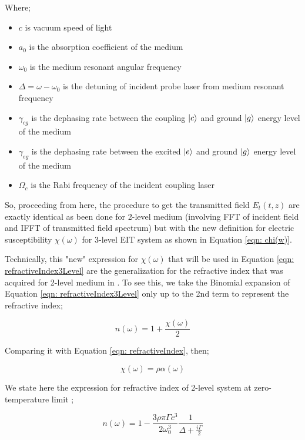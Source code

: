 Where;

\begin{itemize}
    \item $c$ is vacuum speed of light
    \item $a_{0}$ is the absorption coefficient of the medium
    \item $\omega_{0}$ is the medium resonant angular frequency
    \item $\Delta = \omega - \omega_{0}$ is the detuning of incident probe laser from medium resonant frequency
    \item $\gamma_{cg}$ is the dephasing rate between the coupling $\ket{c}$ and ground $\ket{g}$ energy level of the medium
    \item $\gamma_{eg}$ is the dephasing rate between the excited $\ket{e}$ and ground $\ket{g}$ energy level of the medium
    \item $\Omega_{c}$ is the Rabi frequency of the incident coupling laser
\end{itemize}   

So, proceeding from here, the procedure to get the transmitted field $E_{t}(t, z)$ are exactly identical as been done for 2-level medium (involving FFT of incident field and IFFT of transmitted field spectrum) but with the new definition for electric susceptibility $\chi(\omega)$ for 3-level EIT system as shown in Equation \ref{eqn: chi(w)}.

Technically, this "new" expression for $\chi(\omega)$ that will be used in Equation \ref{eqn: refractiveIndex3Level} are the generalization for the refractive index that was acquired for 2-level medium in \cite{Kwong2017}. To see this, we take the Binomial expansion of Equation \ref{eqn: refractiveIndex3Level} only up to the 2nd term to represent the refractive index;

\begin{equation}
    n(\omega) = 1 + \frac{\chi(\omega)}{2}
\end{equation}

Comparing it with Equation \ref{eqn: refractiveIndex}, then;

\begin{equation}
    \chi(\omega) = \rho \alpha(\omega)
\end{equation}

We state here the expression for refractive index of 2-level system at zero-temperature limit \cite{Kwong2017};

\begin{equation}
    n(\omega) = 1 - \frac{3\rho\pi\Gamma c^{3}}{2\omega_{0}^{3}} \frac{1}{\Delta + \frac{i\Gamma}{2}}
    \label{eqn: refractiveIndex2Level}
\end{equation}

